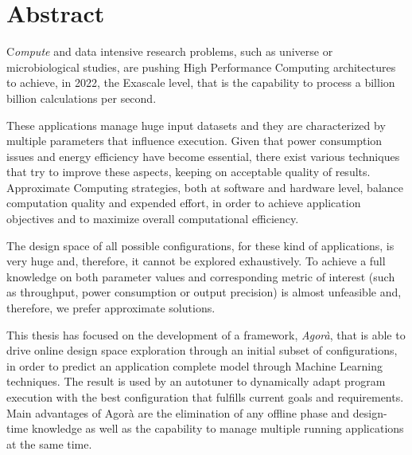 \chapter*{Abstract}

\lettrine{C}{}\textit{ompute} and data intensive research problems, such as universe or microbiological studies, are pushing High Performance Computing architectures to achieve, in 2022, the Exascale level, that is the capability to process a billion billion calculations per second.

These applications manage huge input datasets and they are characterized by multiple parameters that influence execution. Given that power consumption issues and energy efficiency have become essential, there exist various techniques that try to improve these aspects, keeping on acceptable quality of results. Approximate Computing strategies, both at software and hardware level, balance computation quality and expended effort, in order to achieve application objectives and to maximize overall computational efficiency.

The design space of all possible configurations, for these kind of applications, is very huge and, therefore, it cannot be explored exhaustively. To achieve a full knowledge on both parameter values and corresponding metric of interest (such as throughput, power consumption or output precision) is almost unfeasible and, therefore, we prefer approximate solutions.

This thesis has focused on the development of a framework, \textit{Agorà}, that is able to drive online design space exploration through an initial subset of configurations, in order to predict an application complete model through Machine Learning techniques. The result is used by an autotuner to dynamically adapt program execution with the best configuration that fulfills current goals and requirements. Main advantages of Agorà are the elimination of any offline phase and design-time knowledge as well as the capability to manage multiple running applications at the same time.
